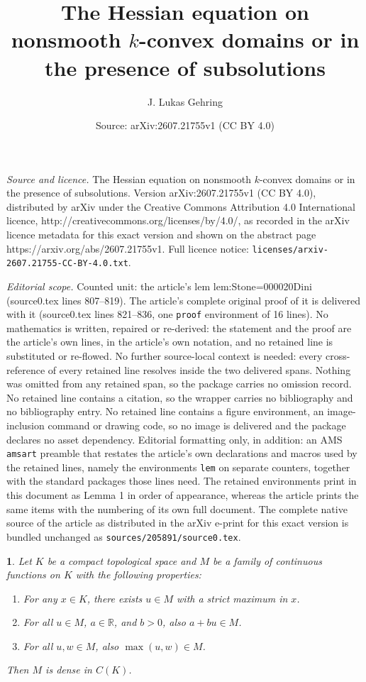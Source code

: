 \documentclass[10pt,a4paper]{amsart}
\title{The Hessian equation on nonsmooth $k$-convex domains or in the presence of subsolutions}
\author{J. Lukas Gehring}
\date{Source: arXiv:2607.21755v1 (CC BY 4.0)}
\newtheorem{lem}{}
\begin{document}
\maketitle

\noindent\emph{Source and licence.} The Hessian equation on nonsmooth $k$-convex domains or in the presence of subsolutions. Version arXiv:2607.21755v1 (CC BY 4.0), distributed by arXiv under the Creative Commons Attribution 4.0 International licence, http://creativecommons.org/licenses/by/4.0/, as recorded in the arXiv licence metadata for this exact version and shown on the abstract page https://arxiv.org/abs/2607.21755v1. Full licence notice: \texttt{licenses/arxiv-2607.21755-CC-BY-4.0.txt}.\par\smallskip

\noindent\textit{Editorial scope.} Counted unit: the article's lem lem:Stone=000020Dini (source0.tex lines 807--819). The article's complete original proof of it is delivered with it (source0.tex lines 821--836, one \texttt{proof} environment of 16 lines). No mathematics is written, repaired or re-derived: the statement and the proof are the article's own lines, in the article's own notation, and no retained line is substituted or re-flowed.  No further source-local context is needed: every cross-reference of every retained line resolves inside the two delivered spans.  Nothing was omitted from any retained span, so the package carries no omission record.  No retained line contains a citation, so the wrapper carries no bibliography and no bibliography entry.  No retained line contains a figure environment, an image-inclusion command or drawing code, so no image is delivered and the package declares no asset dependency.  Editorial formatting only, in addition: an AMS \texttt{amsart} preamble that restates the article's own declarations and macros used by the retained lines, namely the environments \texttt{lem} on separate counters, together with the standard packages those lines need.  The retained environments print in this document as Lemma 1 in order of appearance, whereas the article prints the same items with the numbering of its own full document.  The complete native source of the article as distributed in the arXiv e-print for this exact version is bundled unchanged as \texttt{sources/205891/source0.tex}.
\begin{lem}
\label{lem:Stone=000020Dini}Let $K$ be a compact topological space
and $M$ be a family of continuous functions on $K$ with the following
properties:
\begin{enumerate}
\item For any $x\in K$, there exists $u\in M$ with a strict maximum in
$x$.
\item For all $u\in M$, $a\in\mathbb{R}$, and $b>0$, also $a+bu\in M$.
\item For all $u,w\in M$, also $\max(u,w)\in M$.
\end{enumerate}
Then $M$ is dense in $C(K)$.

\end{lem}
\end{document}

